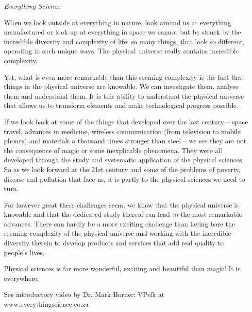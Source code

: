 \newpage
\thispagestyle{empty}

{\normalfont\sffamily\fontsize{22}\normalfont\itshape Everything Science} \par

{ \Large
When we look outside at everything in nature, look around us at everything manufactured or look up at everything in space we cannot but be struck by the incredible diversity and complexity of life; so many things, that look so different, operating in such unique ways. The physical universe really contains incredible complexity.\par

Yet, what is even more remarkable than this seeming complexity is the fact that things in the physical universe are knowable. We can investigate them, analyse them and understand them. It is this ability to understand the physical universe that allows us to transform elements and make technological progress possible.\par

If we look back at some of the things that developed over the last century – space travel, advances in medicine, wireless communication (from television to mobile phones) and materials a thousand times stronger than steel – we see they are not the consequence of magic or some inexplicable phenomena. They were all developed through the study and systematic application of the physical sciences. So as we look forward at the 21st century and some of the problems of poverty, disease and pollution that face us, it is partly to the physical sciences we need to turn. \par

For however great these challenges seem, we know that the physical universe is knowable and that the dedicated study thereof can lead to the most remarkable advances. There can hardly be a more exciting challenge than laying bare the seeming complexity of the physical universe and working with the incredible diversity therein to develop products and services that add real quality to people’s lives.\par

Physical sciences is far more wonderful, exciting and beautiful than magic! It is everywhere.

See introductory video by Dr. Mark Horner:  VPsfk  at www.everythingscience.co.za

}





